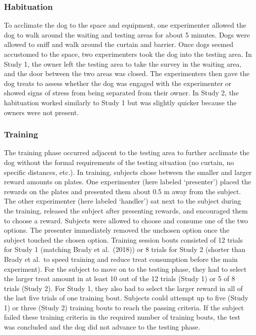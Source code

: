 \documentclass[
  pub,floatsintext]{apa6}
\begin{document}
\hypertarget{habituation}{%
\subsubsection{Habituation}\label{habituation}}

To acclimate the dog to the space and equipment, one experimenter allowed the dog to walk around the waiting and testing areas for about 5 minutes. Dogs were allowed to sniff and walk around the curtain and barrier. Once dogs seemed accustomed to the space, two experimenters took the dog into the testing area. In Study 1, the owner left the testing area to take the survey in the waiting area, and the door between the two areas was closed. The experimenters then gave the dog treats to assess whether the dog was engaged with the experimenter or showed signs of stress from being separated from their owner. In Study 2, the habituation worked similarly to Study 1 but was slightly quicker because the owners were not present.

\hypertarget{training}{%
\subsubsection{Training}\label{training}}

The training phase occurred adjacent to the testing area to further acclimate the dog without the formal requirements of the testing situation (no curtain, no specific distances, etc.). In training, subjects chose between the smaller and larger reward amounts on plates. One experimenter (here labeled `presenter') placed the rewards on the plates and presented them about 0.5 m away from the subject. The other experimenter (here labeled `handler') sat next to the subject during the training, released the subject after presenting rewards, and encouraged them to choose a reward. Subjects were allowed to choose and consume one of the two options. The presenter immediately removed the unchosen option once the subject touched the chosen option. Training session bouts consisted of 12 trials for Study 1 (matching Brady et al.~(2018)) or 8 trials for Study 2 (shorter than Brady et al.~to speed training and reduce treat consumption before the main experiment). For the subject to move on to the testing phase, they had to select the larger treat amount in at least 10 out of the 12 trials (Study 1) or 5 of 8 trials (Study 2). For Study 1, they also had to select the larger reward in all of the last five trials of one training bout. Subjects could attempt up to five (Study 1) or three (Study 2) training bouts to reach the passing criteria. If the subject failed these training criteria in the required number of training bouts, the test was concluded and the dog did not advance to the testing phase.
\end{document}
